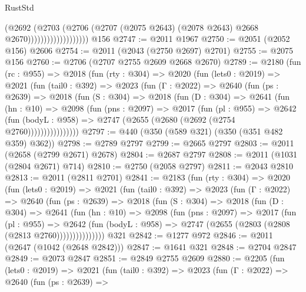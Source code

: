 \begin{lexlean}{RustStd}
\begin{coremodule}
                                  (@2692
                                    (@2703
                                      (@2706
                                        (@2707
                                          (@2075 @2643)
                                          (@2078 @2643)
                                          @2668
                                          @2670)))))))))))))))))))
    @156
@2747 := @2011 @1967
@2750 := @2051 (@2052 @156) @2606
@2754 := @2011 (@2043 (@2750 @2697) @2701)
@2755 := @2075 @156
@2760 := @2706 (@2707 @2755 @2609 @2668 @2670)
@2789 := @2180
    (fun (rc : @955) =>
    @2018
      (fun (rty : @304) =>
      @2020
        (fun (lets0 : @2019) =>
        @2021
          (fun (tail0 : @392) =>
          @2023
            (fun (Γ : @2022) =>
            @2640
              (fun (ps : @2639) =>
              @2018
                (fun (S : @304) =>
                @2018
                  (fun (D : @304) =>
                  @2641
                    (fun (hn : @10) =>
                    @2098
                      (fun (pns : @2097) =>
                      @2017
                        (fun (pl : @955) =>
                        @2642
                          (fun (bodyL : @958) =>
                          @2747 (@2655 (@2680 (@2692 (@2754 @2760))))))))))))))))
@2797 := @440 (@350 (@589 @321) (@350 (@351 @482 @359) @362))
@2798 := @2789 @2797
@2799 := @2665 @2797
@2803 := @2011 (@2658 (@2799 @2671) @2678)
@2804 := @2687 @2797
@2808 := @2011 (@1031 (@2804 @2671) @714)
@2810 := @2750 (@2058 @2797)
@2811 := @2043 @2810
@2813 := @2011 (@2811 @2701)
@2841 := @2183
    (fun (rty : @304) =>
    @2020
      (fun (lets0 : @2019) =>
      @2021
        (fun (tail0 : @392) =>
        @2023
          (fun (Γ : @2022) =>
          @2640
            (fun (ps : @2639) =>
            @2018
              (fun (S : @304) =>
              @2018
                (fun (D : @304) =>
                @2641
                  (fun (hn : @10) =>
                  @2098
                    (fun (pns : @2097) =>
                    @2017
                      (fun (pl : @955) =>
                      @2642
                        (fun (bodyL : @958) =>
                        @2747 (@2655 (@2803 (@2808 (@2813 @2760)))))))))))))))
    @321
@2842 := @1277 @972
@2846 := @2011 (@2647 (@1042 (@2648 @2842)))
@2847 := @1641 @321
@2848 := @2704 @2847
@2849 := @2073 @2847
@2851 := @2849 @2755 @2609
@2880 := @2205
    (fun (lets0 : @2019) =>
    @2021
      (fun (tail0 : @392) =>
      @2023
        (fun (Γ : @2022) =>
        @2640
          (fun (ps : @2639) =>

\end{coremodule}
\end{lexlean}
